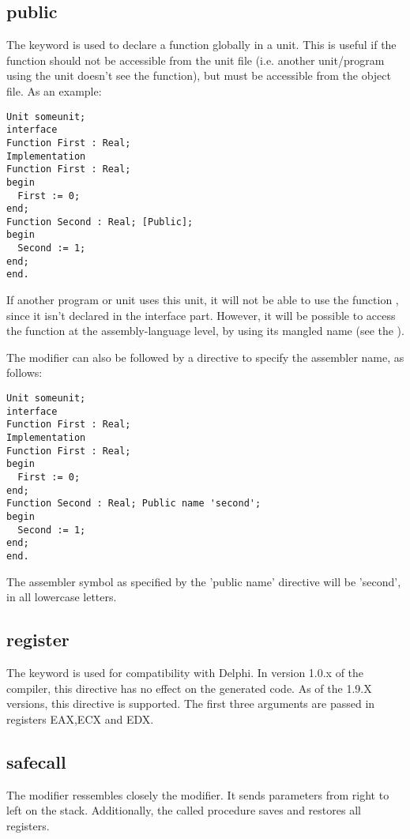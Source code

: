 \subsection{public}
\label{se:public}
The  keyword is used to declare a function globally in a unit.
This is useful if the function should not be accessible from the unit
file (i.e. another unit/program using the unit doesn't see the function),
but must be accessible from the object file. As an example:
\begin{verbatim}
Unit someunit;
interface
Function First : Real;
Implementation
Function First : Real;
begin
  First := 0;
end;
Function Second : Real; [Public];
begin
  Second := 1;
end;
end.
\end{verbatim}
If another program or unit uses this unit, it will not be able to use the
function , since it isn't declared in the interface part.
However, it will be possible to access the function  at the
assembly-language level, by using its mangled name (see the \progref).

The  modifier can also be followed by a  directive to
specify the assembler name, as follows:
\begin{verbatim}
Unit someunit;
interface
Function First : Real; 
Implementation
Function First : Real;
begin
  First := 0;
end;
Function Second : Real; Public name 'second';
begin
  Second := 1;
end;
end.
\end{verbatim}
The assembler symbol as specified by the 'public name' directive will 
be 'second', in all lowercase letters.

\subsection{register}
\label{se:register}
The  keyword is used for compatibility with Delphi. In
version 1.0.x of the compiler, this directive has no effect on the
generated code. As of the 1.9.X versions, this directive is supported. The
first three arguments are passed in registers EAX,ECX and EDX.

\subsection{safecall}
The  modifier ressembles closely the  modifier. 
It sends parameters from right to left on the stack. Additionally, the 
called procedure saves and restores all registers.

